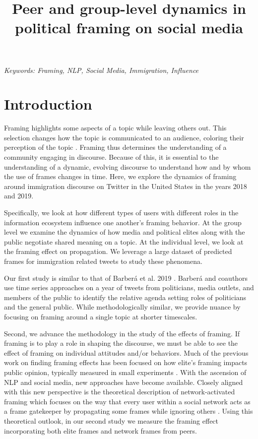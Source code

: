 \documentclass[a4paper,12pt]{article}
\title{Peer and group-level dynamics in political framing on social media}
\date{}
\begin{document}
\maketitle
\thispagestyle{fancy}

\begin{center}
\textit{Keywords: Framing, NLP, Social Media, Immigration, Influence}
\newline
\end{center}

\section*{Introduction}

    Framing highlights some aspects of a topic while leaving others out. This selection changes how the topic is communicated to an audience, coloring their perception of the topic \cite{entman_framing_1993}. Framing thus determines the understanding of a community engaging in discourse. Because of this, it is essential to the understanding of a dynamic, evolving discourse to understand how and by whom the use of frames changes in time. Here, we explore the dynamics of framing around immigration discourse on Twitter in the United States in the years 2018 and 2019.
        
    Specifically, we look at how different types of users with different roles in the information ecosystem influence one another's framing behavior. At the group level we examine the dynamics of how media and political elites along with the public negotiate shared meaning on a topic. At the individual level, we look at the framing effect on propagation. We leverage a large dataset of predicted frames for immigration related tweets \cite{mendelsohn_modeling_2021} to study these phenomena.

    Our first study is similar to that of Barber\'a et al. 2019 \cite{barbera_who_2019}. Barber\'a and coauthors use time series approaches on a year of tweets from politicians, media outlets, and members of the public to identify the relative agenda setting roles of politicians and the general public. While methodologically similar, we provide nuance by focusing on framing around a single topic at shorter timescales.

    Second, we advance the methodology in the study of the effects of framing. If framing is to play a role in shaping the discourse, we must be able to see the effect of framing on individual attitudes and/or behaviors. Much of the previous work on finding framing effects has been focused on how elite's framing impacts public opinion, typically measured in small experiments \cite{chong_framing_2007}. With the ascension of NLP and social media, new approaches have become available. Closely aligned with this new perspective is the theoretical description of network-activated framing which focuses on the way that every user within a social network acts as a frame gatekeeper by propagating some frames while ignoring others \cite{peters_network-activated_2019}. Using this theoretical outlook, in our second study we measure the framing effect incorporating both elite frames and network frames from peers.
\end{document}
